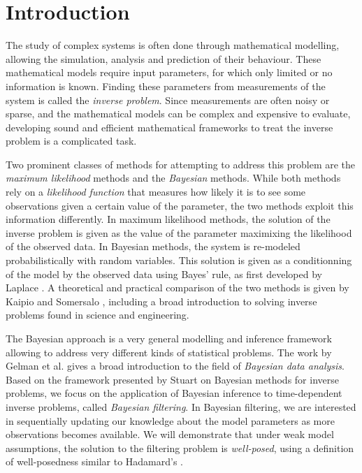 \section{Introduction}
\setcounter{page}{1}
\thispagestyle{empty}

The study of complex systems is often done through mathematical modelling, allowing the simulation, analysis and prediction of their behaviour. These mathematical models require input parameters, for which only limited or no information is known. Finding these parameters from measurements of the system is called the \textit{inverse problem}. Since measurements are often noisy or sparse, and the mathematical models can be complex and expensive to evaluate, developing sound and efficient mathematical frameworks to treat the inverse problem is a complicated task.

Two prominent classes of methods for attempting to address this problem are the \textit{maximum likelihood} methods and the \textit{Bayesian} methods. While both methods rely on a \textit{likelihood function} that measures how likely it is to see some observations given a certain value of the parameter, the two methods exploit this information differently. In maximum likelihood methods, the solution of the inverse problem is given as the value of the parameter maximixing the likelihood of the observed data. In Bayesian methods, the system is re-modeled probabilistically with random variables. This solution is given as a conditionning of the model by the observed data using Bayes' rule, as first developed by Laplace \cite{laplace1820theorie}. A theoretical and practical comparison of the two methods is given by Kaipio and Somersalo \cite{kaipio2006statistical}, including a broad introduction to solving inverse problems found in science and engineering. 

The Bayesian approach is a very general modelling and inference framework allowing to address very different kinds of statistical problems. The work by Gelman et al. \cite{gelman} gives a broad introduction to the field of \textit{Bayesian data analysis}. Based on the framework presented by Stuart \cite{stuart_2010} on Bayesian methods for inverse problems, we focus on the application of Bayesian inference to time-dependent inverse problems, called \textit{Bayesian filtering}. In Bayesian filtering, we are interested in sequentially updating our knowledge about the model parameters as more observations becomes available. We will demonstrate that under weak model assumptions, the solution to the filtering problem is \textit{well-posed}, using a definition of well-posedness similar to Hadamard's \cite{hadamard}.

